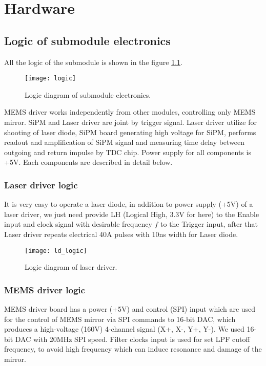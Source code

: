 \chapter{Hardware}
\section{Logic of submodule electronics}

All the logic of the submodule is shown in the figure \ref{fig:submodule_logic}.

\begin{figure}[H]
\texttt{[image: logic]}
\caption{Logic diagram of submodule electronics.}
\label{fig:submodule_logic}
\end{figure}

MEMS driver works independently from other modules, controlling only MEMS mirror. SiPM and Laser driver are joint by trigger signal. Laser driver utilize for shooting of laser diode, SiPM board generating high voltage for SiPM, performs readout and amplification of SiPM signal and measuring time delay between outgoing and return impulse by TDC chip.
Power supply for all components is +5V. Each components are described in detail below.

\subsection{Laser driver logic}
It is very easy to operate a laser diode, in addition to power supply (+5V) of a laser driver, we just need provide LH (Logical High, 3.3V for here) to the Enable input and clock signal with desirable frequency $f$ to the Trigger input, after that Laser driver repeats electrical 40A pulses with 10ns width for Laser diode.

\begin{figure}[H]
\texttt{[image: ld\_logic]}
\caption{Logic diagram of laser driver.}
\label{fig:real_submodule}
\end{figure}

\subsection{MEMS driver logic}

MEMS driver board has a power (+5V) and control (SPI) input which are used for the control of MEMS mirror via SPI commands to 16-bit DAC, which produces a high-voltage (160V) 4-channel signal (X+, X-, Y+, Y-). 
We used 16-bit DAC with 20MHz SPI speed. 
Filter clocks input is used for set LPF cutoff frequency, to avoid high frequency which can induce resonance and damage of the mirror.


